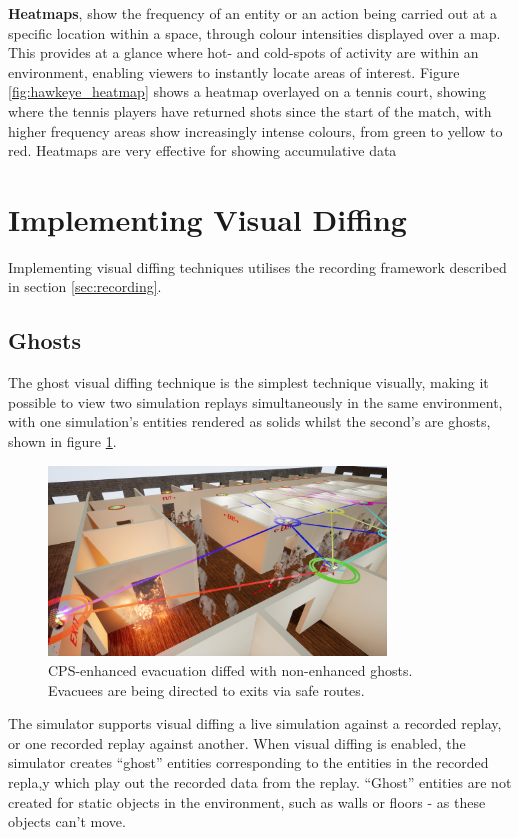 \textbf{Heatmaps}, show the frequency of an entity or an action being carried out at a specific location within a space, through colour intensities displayed over a map. This provides at a glance where hot- and cold-spots of activity are within an environment, enabling viewers to instantly locate areas of interest. Figure \ref{fig:hawkeye_heatmap} shows a heatmap overlayed on a tennis court, showing where the tennis players have returned shots since the start of the match, with higher frequency areas show increasingly intense colours, from green to yellow to red. Heatmaps are very effective for showing accumulative data  


\section{Implementing Visual Diffing} %
\label{sec:implementing_visual_diffing}
Implementing visual diffing techniques utilises the recording framework described in section \ref{sec:recording}.

\subsection{Ghosts} %
\label{sub:ghosts}
The ghost visual diffing technique is the simplest technique visually, making it possible to view two simulation replays simultaneously in the same environment, with one simulation's entities rendered as solids whilst the second's are ghosts, shown in figure \ref{fig:cps_diff}.

\begin{figure}[h]
    \centering
	\includegraphics[width=0.8\textwidth]{img/fireEvacCPS2.png}
	\caption{CPS-enhanced evacuation diffed with non-enhanced ghosts. Evacuees are being directed to exits via safe routes.}
	\label{fig:cps_diff}
\end{figure}
The simulator supports visual diffing a live simulation against a recorded replay, or one recorded replay against another. When visual diffing is enabled, the simulator creates ``ghost'' entities corresponding to the entities in the recorded repla,y which play out the recorded data from the replay. ``Ghost'' entities are not created for static objects in the environment, such as walls or floors - as these objects can't move.

